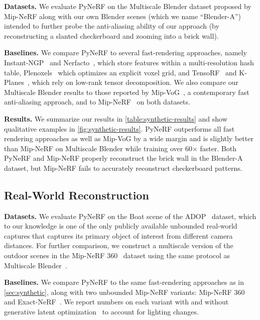\documentclass{article}
\newcommand{\method}{PyNeRF\xspace}
\begin{document}
\textbf{Datasets.}
We evaluate \method on the Multiscale Blender dataset proposed by Mip-NeRF along with our own Blender scenes (which we name ``Blender-A'') intended to further probe the anti-aliasing ability of our approach (by reconstructing a slanted checkerboard and zooming into a brick wall).

\textbf{Baselines.}
We compare \method to several fast-rendering approaches, namely Instant-NGP~\cite{mueller2022instant} and Nerfacto~\cite{nerfstudio}, which store features within a multi-resolution hash table, Plenoxels~\cite{yu_and_fridovichkeil2021plenoxels} which optimizes an explicit voxel grid, and TensoRF~\cite{Chen2022ECCV} and K-Planes~\cite{kplanes_2023}, which rely on low-rank tensor decomposition.
We also compare our Multiscale Blender results to those reported by Mip-VoG~\cite{hu2023multiscale}, a contemporary fast anti-aliasing approach, and to Mip-NeRF~\cite{barron2021mipnerf} on both datasets.

\textbf{Results.}
We summarize our results in \cref{table:synthetic-results} and show qualitative examples in \cref{fig:synthetic-results}.
\method outperforms all fast rendering approaches as well as Mip-VoG by a wide margin and is slightly better than Mip-NeRF on Multiscale Blender while training over 60× faster.
Both \method and Mip-NeRF properly reconstruct the brick wall in the Blender-A dataset, but Mip-NeRF fails to accurately reconstruct checkerboard patterns.

\subsection{Real-World Reconstruction}
\label{sec:real-world}

\textbf{Datasets.}
We evaluate \method on the Boat scene of the ADOP~\cite{adop} dataset, which to our knowledge is one of the only publicly available unbounded real-world captures that captures its primary object of interest from different camera distances.
For further comparison, we construct a multiscale version of the outdoor scenes in the Mip-NeRF 360~\cite{barron2022mipnerf360} dataset using the same protocol as Multiscale Blender~\cite{barron2021mipnerf}.

\textbf{Baselines.}
We compare \method to the same fast-rendering approaches as in \cref{sec:synthetic}, along with two unbounded Mip-NeRF variants: Mip-NeRF 360~\cite{barron2022mipnerf360} and Exact-NeRF~\cite{isaacmedina2023exactnerf}.
We report numbers on each variant with and without generative latent optimization~\cite{martinbrualla2020nerfw} to account for lighting changes.
\end{document}
